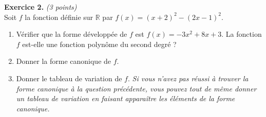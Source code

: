 \documentclass[11pt]{article}
\begin{document}
\noindent\textbf{Exercice 2.} \hspace{.5cm}\emph{(3 points)}\\
Soit $f$ la fonction définie sur $\mathbb{R}$ par $f(x)=(x+2)^2-(2x-1)^2$.
\begin{enumerate}
  \item Vérifier que la forme développée de $f$ est $f(x) = -3x^2+8x+3$.
    La fonction $f$ est-elle une fonction polynôme du second degré ?
  \item Donner la forme canonique de $f$.
  \item Donner le tableau de variation de $f$. \emph{Si vous n'avez pas réussi à
    trouver la forme canonique à la question précédente, vous pouvez tout de
    même donner un tableau de variation en faisant apparaître les éléments
    de la forme canonique.}
\end{enumerate}
\end{document}
